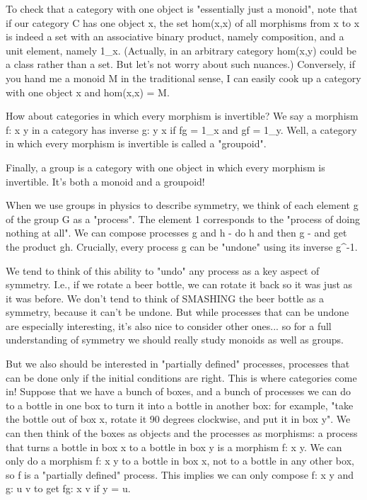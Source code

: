 To check that a category with one object is "essentially just a
monoid", note that if our category C has one object x, the set
hom(x,x) of all morphisms from x to x is indeed a set with an
associative binary product, namely composition, and a unit element,
namely 1_{x}.  (Actually, in an arbitrary category hom(x,y) could be a
class rather than a set.  But let's not worry about such nuances.)
Conversely, if you hand me a monoid M in the traditional sense, I can
easily cook up a category with one object x and hom(x,x) = M.

How about categories in which every morphism is invertible?  We say a
morphism f: x \to  y in a category has inverse g: y \to  x if fg =
1_{x} and gf = 1_{y}.  Well, a category in which every
morphism is invertible is called a "groupoid".

Finally, a group is a category with one object in which every morphism
is invertible.  It's both a monoid and a groupoid! 

When we use groups in physics to describe symmetry, we think of each
element g of the group G as a "process".  The element 1
corresponds to the "process of doing nothing at all".  We can
compose processes g and h - do h and then g - and get the product gh.
Crucially, every process g can be "undone" using its inverse
g^{-1}.


We tend to think of this ability to "undo" any process as a
key aspect of symmetry.  I.e., if we rotate a beer bottle, we can rotate
it back so it was just as it was before.  We don't tend to think of
SMASHING the beer bottle as a symmetry, because it can't be undone.  But
while processes that can be undone are especially interesting, it's also
nice to consider other ones... so for a full understanding of symmetry
we should really study monoids as well as groups.

But we also should be interested in "partially defined"
processes, processes that can be done only if the initial conditions are
right.  This is where categories come in!  Suppose that we have a bunch
of boxes, and a bunch of processes we can do to a bottle in one box to
turn it into a bottle in another box: for example, "take the bottle
out of box x, rotate it 90 degrees clockwise, and put it in box y".
We can then think of the boxes as objects and the processes as
morphisms: a process that turns a bottle in box x to a bottle in box y
is a morphism f: x \to  y.  We can only do a morphism f: x \to  y to a
bottle in box x, not to a bottle in any other box, so f is a
"partially defined" process.  This implies we can only compose
f: x \to  y and g: u \to  v to get fg: x \to  v if y = u.

